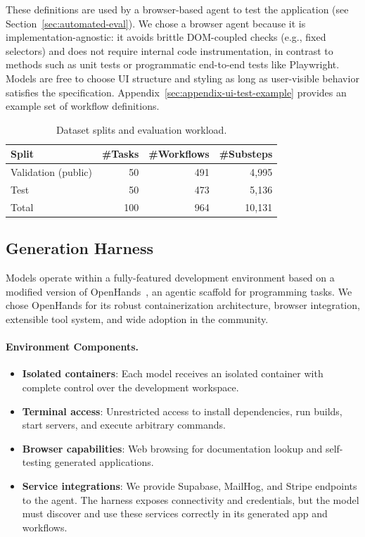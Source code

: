 These definitions are used by a browser-based agent to test the application (see Section~\ref{sec:automated-eval}). We chose a browser agent because it is implementation-agnostic: it avoids brittle DOM-coupled checks (e.g., fixed selectors) and does not require internal code instrumentation, in contrast to methods such as unit tests or programmatic end-to-end tests like Playwright. Models are free to choose UI structure and styling as long as user-visible behavior satisfies the specification. Appendix~\ref{sec:appendix-ui-test-example} provides an example set of workflow definitions.

\begin{table}[h]
\caption{Dataset splits and evaluation workload.}
\label{tab:splits}
\small
\begin{tabular}{@{}lrrr@{}}
\toprule
\textbf{Split} & \textbf{\#Tasks} & \textbf{\#Workflows} & \textbf{\#Substeps} \\
\midrule
Validation (public) & 50 & 491 & 4,995 \\
Test & 50 & 473 & 5,136 \\
\midrule
Total & 100 & 964 & 10,131 \\
\bottomrule
\end{tabular}
\end{table}



\subsection{Generation Harness}
\label{sec:generation-harness}

Models operate within a fully-featured development environment based on a modified version of OpenHands~\cite{wang2024openhands}, an agentic scaffold for programming tasks. We chose OpenHands for its robust containerization architecture, browser integration, extensible tool system, and wide adoption in the community.

\paragraph{Environment Components.}
\begin{itemize}
    \item \textbf{Isolated containers}: Each model receives an isolated container with complete control over the development workspace.
    \item \textbf{Terminal access}: Unrestricted access to install dependencies, run builds, start servers, and execute arbitrary commands.
    \item \textbf{Browser capabilities}: Web browsing for documentation lookup and self-testing generated applications.
    \item \textbf{Service integrations}: We provide Supabase, MailHog, and Stripe endpoints to the agent. The harness exposes connectivity and credentials, but the model must discover and use these services correctly in its generated app and workflows.
\end{itemize}

